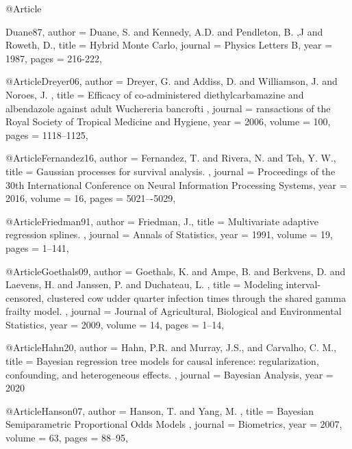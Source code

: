 @Article{Duane87,
   author =   {Duane, S. and Kennedy, A.D. and Pendleton, B. ,J and Roweth, D.},
   title =    {Hybrid Monte Carlo},
   journal =      {Physics Letters B},
   year =     {1987},
   pages =    {216-222},
   
 }
      




@Article{Dreyer06,
   author =   {Dreyer, G. and Addiss, D. and Williamson, J. and Noroes, J. },
   title =    { Efficacy of co-administered diethylcarbamazine and albendazole against adult Wuchereria bancrofti },
   journal =      {ransactions of the Royal Society of Tropical Medicine and Hygiene},
   year =     {2006},
   volume =   {100},
   pages =    {1118–1125},
 }






@Article{Fernandez16,
   author =   {Fernandez, T. and Rivera, N. and Teh, Y. W.},
   title =    { Gaussian processes for survival analysis.  },
   journal =      {Proceedings of the 30th International Conference on Neural Information Processing Systems},
   year =     {2016},
   volume =   {16},
   pages =    {5021–-5029},
 }








@Article{Friedman91,
   author =   {Friedman, J.},
   title =    { Multivariate adaptive regression splines.  },
   journal =      {Annals of Statistics},
   year =     {1991},
   volume =   {19},
   pages =    {1--141},
 }



@Article{Goethals09,
   author =   {Goethals, K. and Ampe, B. and Berkvens, D. and Laevens, H. and Janssen, P. and Duchateau, L. },
   title =    {  Modeling interval-censored, clustered cow udder quarter infection times through the shared gamma frailty model.  },
   journal =      {Journal of Agricultural, Biological and Environmental Statistics},
   year =     {2009},
   volume =   {14},
   pages =    {1--14},
 }




@Article{Hahn20,
   author =   {Hahn, P.R. and Murray, J.S., and Carvalho, C. M.},
   title =    { Bayesian regression tree models for causal inference: regularization, confounding, and heterogeneous effects. },
   journal =      {Bayesian Analysis},
   year =     {2020}
 }



@Article{Hanson07,
   author =   {Hanson, T. and Yang, M. },
   title =    { Bayesian Semiparametric Proportional Odds Models },
   journal =      {Biometrics},
   year =     {2007},
   volume =   {63},
   pages =    {88--95},
 }



